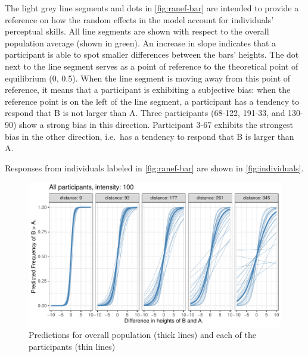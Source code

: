 The light grey line segments and dots in \autoref{fig:ranef-bar} are intended to provide a reference on how the random effects in the model account for individuals' perceptual skills. All line segments are shown with respect to the overall population average (shown in green). An increase in slope indicates that a participant is able to spot smaller differences between the bars' heights. 
The dot next to the line segment serves as a point of reference to the theoretical point of equilibrium (0, 0.5). When the line segment is moving away from this point of reference, it means that a participant is exhibiting a subjective bias: when the reference point is on the left of the line segment,  a participant has a tendency to respond that B is not larger than A. Three participants (68-122, 191-33, and 130-90) show a strong bias in this direction. Participant 3-67 exhibits the strongest bias in the other direction, i.e.\ has a tendency to respond that B is larger than A.

Responses from individuals labeled in \autoref{fig:ranef-bar} are shown in \autoref{fig:individuals}. 

\begin{knitrout}
\color{fgcolor}\begin{figure}
\includegraphics[width=\maxwidth]{figure/pop-1} \caption[Predictions for overall population (thick lines) and each of the participants (thin lines)]{Predictions for overall population (thick lines) and each of the participants (thin lines)}\label{fig:pop}
\end{figure}

\end{knitrout}





